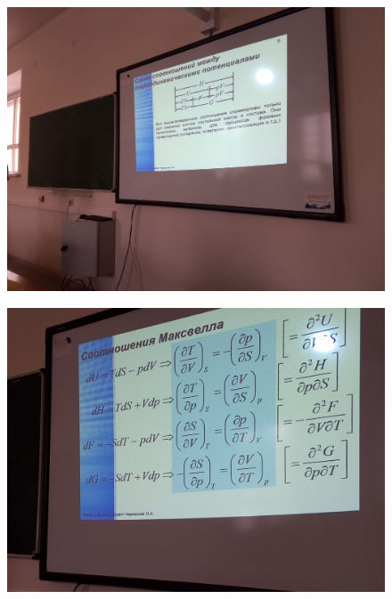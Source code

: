 \documentclass{article}
\begin{document}
\begin{figure}[H]
    \includegraphics[width=\textwidth]{8.jpg}
\end{figure}

\begin{figure}[H]
    \includegraphics[width=\textwidth]{9.jpg}
\end{figure}
\end{document}
